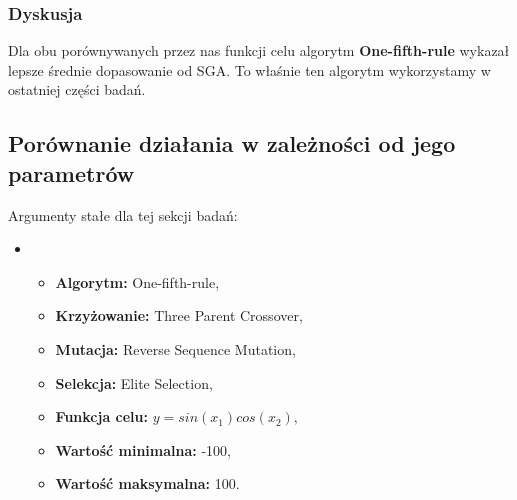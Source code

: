 \documentclass{classrep}
\begin{document}
\subsubsection*{Dyskusja}

Dla obu porównywanych przez nas funkcji celu algorytm \textbf{One-fifth-rule} wykazał lepsze średnie dopasowanie od SGA. To właśnie ten algorytm wykorzystamy w ostatniej części badań.


\subsection{Porównanie działania w zależności od jego parametrów}

Argumenty stałe dla tej sekcji badań:
\begin{itemize}
    \item[]
    \begin{itemize}
        \item \textbf{Algorytm:} One-fifth-rule,
        \item \textbf{Krzyżowanie:} Three Parent Crossover,
        \item \textbf{Mutacja:} Reverse Sequence Mutation,
        \item \textbf{Selekcja:} Elite Selection,
        \item \textbf{Funkcja celu:} $y=sin(x_1)cos(x_2),$
        \item \textbf{Wartość minimalna:} -100,
        \item \textbf{Wartość maksymalna:} 100.
    \end{itemize}
\end{itemize}
\end{document}
